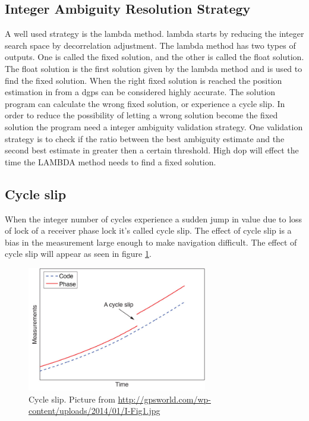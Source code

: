 \subsection{Integer Ambiguity Resolution Strategy}\label{ss:INtegerAM}
A well used strategy is the \gls{lambda} method. \gls{lambda} starts by reducing the integer search space by decorrelation adjustment. The \gls{lambda} method has two types of outputs. One is called the fixed solution, and the other is called the float solution. The float solution is the first solution given by the \gls{lambda} method and is used to find the fixed solution. When the right fixed solution is reached the position estimation in from a \gls{dgps} can be considered highly accurate. The solution program can calculate the wrong fixed solution, or experience a cycle slip. In order to reduce the possibility of letting a wrong solution become the fixed solution the program need a integer ambiguity validation strategy. One validation strategy is to check if the ratio between the best ambiguity estimate and the second best estimate in greater then a certain threshold. High \gls{dop} will effect the time the LAMBDA method needs to find a fixed solution.

\subsection{Cycle slip}\label{ss:cycleSlip}
When the integer number of cycles experience a sudden jump in value due to loss of lock of a receiver phase lock it's called cycle slip. The effect of cycle slip is a bias in the measurement large enough to make navigation difficult. The effect of cycle slip will appear as seen in figure \ref{figure:CycleSlip}.
\begin{figure}[H]
	\centering
		\includegraphics[width=0.7\textwidth]{figs/cycleSlip.jpg}
		\caption{Cycle slip. Picture from \url{http://gpsworld.com/wp-content/uploads/2014/01/I-Fig1.jpg}}
		\label{figure:CycleSlip}
\end{figure}
